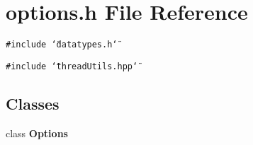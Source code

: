 \section{options.h File Reference}
\label{options_8h}
{\tt \#include \char`\"{}datatypes.h\char`\"{}}\par
{\tt \#include \char`\"{}thread\-Utils.hpp\char`\"{}}\par
\subsection*{Classes}
\begin{CompactItemize}
\item 
class {\bf Options}
\end{CompactItemize}
